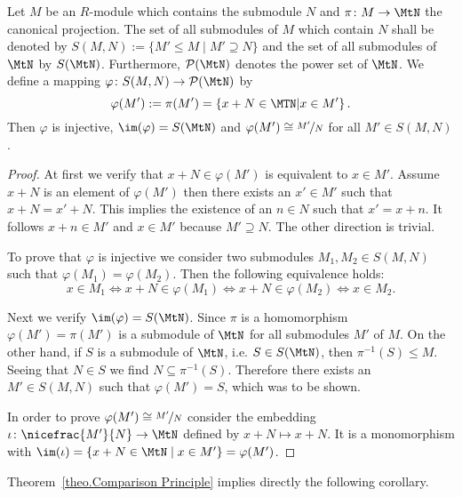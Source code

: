 \begin{theo} \label{theo.Comparison Principle}
Let $M$ be an $R$-module which contains the submodule $N$ and $\pi\colon M\to\MtN$ the canonical projection. The set of all submodules of $M$ which contain $N$ shall be denoted by $S(M,N):=\lbrace M'\leq M \mid M'\supseteq N\rbrace$ and the set of all submodules of $\MtN$ by $S(\MtN)$. Furthermore, $\mathcal{P}(\MtN)$ denotes the power set of $\MtN$. We define a mapping $\varphi\colon S(M,N)\to \mathcal{P}(\MtN)$ by
\begin{equation*}
\varphi(M'):=\pi(M')=\left\lbrace x+N\in \MTN \middle\arrowvert x\in M'\right\rbrace.
\end{equation*}
Then $\varphi$ is injective, $\im(\varphi)=S(\MtN)$ and $\varphi(M')\cong\nicefrac{M'}{N}$ for all $M'\in S(M,N)$.
\end{theo}
\begin{proof}
At first we verify that $x+N\in \varphi(M')$ is equivalent to $x\in M'$. Assume $x+N$ is an element of $\varphi(M')$ then there exists an $x'\in M'$ such that $x+N=x'+N$. This implies the existence of an $n\in N$ such that $x'=x+n$. It follows $x+n\in M'$ and $x\in M'$ because $M'\supseteq N$. The other direction is trivial.

To prove that $\varphi$ is injective we consider two submodules $M_1,M_2\in S(M,N)$ such that $\varphi(M_1)=\varphi(M_2)$. Then the following equivalence holds:
\begin{equation*}
x\in M_1\Leftrightarrow x+N\in \varphi(M_1)\Leftrightarrow x+N\in\varphi(M_2)\Leftrightarrow x\in M_2.
\end{equation*}

Next we verify $\im(\varphi)=S(\MtN)$. Since $\pi$ is a homomorphism $\varphi(M')=\pi(M')$ is a submodule of $\MtN$ for all submodules $M'$ of $M$. On the other hand, if $S$ is a submodule of $\MtN$, i.e. $S\in S(\MtN)$, then $\pi^{-1}(S)\leq M$. Seeing that $N\in S$ we find $N\subseteq\pi^{-1}(S)$. Therefore there exists an $M'\in S(M,N)$ such that $\varphi(M')=S$, which was to be shown.

In order to prove $\varphi(M')\cong\nicefrac{M'}{N}$ consider the embedding $\iota\colon \nicefrac{M'}{N}\to\MtN$ defined by $x+N\mapsto x+N$. It is a monomorphism with $\im(\iota)=\lbrace x+N\in\MtN \mid x\in M'\rbrace=\varphi(M')$.
\end{proof}


Theorem~\ref{theo.Comparison Principle} implies directly the following corollary.

